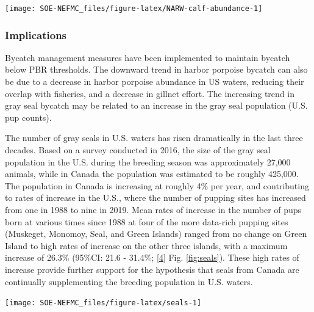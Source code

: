 \documentclass[
  10pt,
]{article}
\let\origfigure\figure
\let\endorigfigure\endfigure
\renewenvironment{figure}[1][2] {
    \expandafter\origfigure\expandafter[H]
} {
    \endorigfigure
}
\begin{document}
\begin{figure}

{\centering \texttt{[image: SOE-NEFMC\_files/figure-latex/NARW-calf-abundance-1]} 

}

\caption{Number of North Atlantic right whale calf births, 1990 - 2021.}\label{fig:NARW-calf-abundance}
\end{figure}

\hypertarget{implications-5}{%
\subsubsection{Implications}\label{implications-5}}

Bycatch management measures have been implemented to maintain bycatch below PBR thresholds. The downward trend in harbor porpoise bycatch can also be due to a decrease in harbor porpoise abundance in US waters, reducing their overlap with fisheries, and a decrease in gillnet effort. The increasing trend in gray seal bycatch may be related to an increase in the gray seal population (U.S. pup counts).

The number of gray seals in U.S. waters has risen dramatically in the last three decades. Based on a survey conducted in 2016, the size of the gray seal population in the U.S. during the breeding season was approximately 27,000 animals, while in Canada the population was estimated to be roughly 425,000. The population in Canada is increasing at roughly 4\% per year, and contributing to rates of increase in the U.S., where the number of pupping sites has increased from one in 1988 to nine in 2019. Mean rates of increase in the number of pups born at various times since 1988 at four of the more data-rich pupping sites (Muskeget, Monomoy, Seal, and Green Islands) ranged from no change on Green Island to high rates of increase on the other three islands, with a maximum increase of 26.3\% (95\%CI: 21.6 - 31.4\%; {[}\protect\hyperlink{ref-wood_rates_2020}{4}{]} Fig. \ref{fig:seals}). These high rates of increase provide further support for the hypothesis that seals from Canada are continually supplementing the breeding population in U.S. waters.

\begin{figure}

{\centering \texttt{[image: SOE-NEFMC\_files/figure-latex/seals-1]} 

}

\caption{Estimated mean rates of increase in the number of gray seal pups born at four United States pupping colonies at various times from 1988 to 2021. Recreated from Wood et al. 2022 (Figure 5).}\label{fig:seals}
\end{figure}
\end{document}
